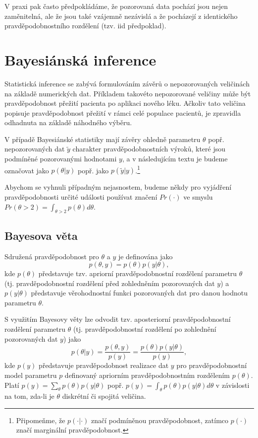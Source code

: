 V praxi pak často předpokládáme, že pozorovaná data pochází jsou nejen zaměnitelná, ale že jsou také vzájemně nezávislá a že pocházejí z identického pravděpodobnostního rozdělení (tzv. iid předpoklad).

\section{Bayesiánská inference}

Statistická inference se zabývá formulováním závěrů o nepozorovaných veličinách na základě numerických dat. Příkladem takovéto nepozorované veličiny může být pravděpodobnost přežití pacienta po aplikaci nového léku. Ačkoliv tato veličina popisuje pravděpodobnost přežití v rámci celé populace pacientů, je zpravidla odhadnuta na základě náhodného výběru.


V případě Bayesiánské statistiky mají závěry ohledně parametru $\theta$ popř. nepozorovaných dat $\tilde{y}$ charakter pravděpodobnostních výroků, které jsou podmíněné pozorovanými hodnotami $y$, a v následujícím textu je budeme označovat jako $p(\theta | y)$ popř. jako $p(\tilde{y} | y)$.\footnote{Připomeňme, že $p(\cdot | \cdot)$ značí podmíněnou pravděpodobnost, zatímco $p(\cdot)$ značí marginální pravděpodobnost.}

Abychom se vyhnuli případným nejasnostem, budeme někdy pro vyjádření pravděpodobnosti určité události používat značení $Pr(\cdot)$ ve smyslu $Pr(\theta > 2) = \int_{\theta > 2} p(\theta)d \theta$.

\subsection{Bayesova věta}

Sdružená pravděpodobnost pro $\theta$ a $y$ je definována jako
\begin{equation}
p(\theta, y) = p(\theta) p(y | \theta),
\end{equation}
kde $p(\theta)$ představuje tzv. apriorní pravděpodobnostní rozdělení parametru $\theta$ (tj. pravděpodobnostní rozdělení před zohledněním pozorovaných dat $y$) a $p(y | \theta)$ představuje věrohodnostní funkci pozorovaných dat pro danou hodnotu parametru $\theta$.

S využitím Bayesovy věty lze odvodit tzv. aposteriorní pravděpodobnostní rozdělení parametru $\theta$ (tj. pravděpodobnostní rozdělení po zohlednění pozorovaných dat $y$) jako
\begin{equation}
p(\theta | y) = \frac{p(\theta, y)}{p(y)} = \frac{p(\theta)p(y | \theta)}{p(y)},
\end{equation}
kde $p(y)$  představuje pravděpodobnost realizace dat $y$ pro pravděpodobnostní model parametru $p$ definovaný apriorním pravděpodobnostním rozdělením $p(\theta)$. Platí $p(y) = \sum_{\theta} p(\theta) p(y|\theta)$ popř. $p(y) = \int_{\theta} p(\theta) p(y | \theta) d \theta$ v závislosti na tom, zda-li je $\theta$ diskrétní či spojitá veličina. 


